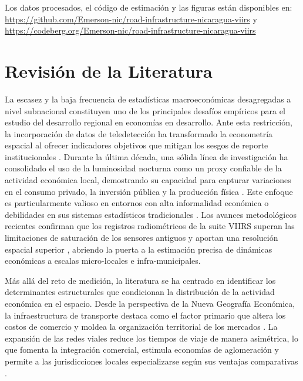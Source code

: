 \documentclass[
  spanish,
  12pt,
  letterpaper]{article}
\begin{document}
Los datos procesados, el código de estimación y las figuras están
disponibles en:
\url{https://github.com/Emerson-nic/road-infrastructure-nicaragua-viirs}
y
\url{https://codeberg.org/Emerson-nic/road-infrastructure-nicaragua-viirs}

\section{Revisión de la Literatura}\label{sec-literatura}

La escasez y la baja frecuencia de estadísticas macroeconómicas
desagregadas a nivel subnacional constituyen uno de los principales
desafíos empíricos para el estudio del desarrollo regional en economías
en desarrollo. Ante esta restricción, la incorporación de datos de
teledetección ha transformado la econometría espacial al ofrecer
indicadores objetivos que mitigan los sesgos de reporte institucionales
\parencite{donaldson2016view}. Durante la última década, una sólida
línea de investigación ha consolidado el uso de la luminosidad nocturna
como un proxy confiable de la actividad económica local, demostrando su
capacidad para capturar variaciones en el consumo privado, la inversión
pública y la producción física
\parencite{henderson2012measuring, chen2011using, mellander2015night}.
Este enfoque es particularmente valioso en entornos con alta
informalidad económica o debilidades en sus sistemas estadísticos
tradicionales
\parencite{michalopoulos2014national, bruederle2018nighttime}. Los
avances metodológicos recientes confirman que los registros
radiométricos de la suite VIIRS superan las limitaciones de saturación
de los sensores antiguos y aportan una resolución espacial superior
\parencite{elvidge2017viirs, gibson2021which}, abriendo la puerta a la
estimación precisa de dinámicas económicas a escalas micro-locales e
infra-municipales.

Más allá del reto de medición, la literatura se ha centrado en
identificar los determinantes estructurales que condicionan la
distribución de la actividad económica en el espacio. Desde la
perspectiva de la Nueva Geografía Económica, la infraestructura de
transporte destaca como el factor primario que altera los costos de
comercio y moldea la organización territorial de los mercados
\parencite{krugman1991increasing, redding2015transportation}. La
expansión de las redes viales reduce los tiempos de viaje de manera
asimétrica, lo que fomenta la integración comercial, estimula economías
de aglomeración y permite a las jurisdicciones locales especializarse
según sus ventajas comparativas \parencite{donaldson2018railroads}.
\end{document}
